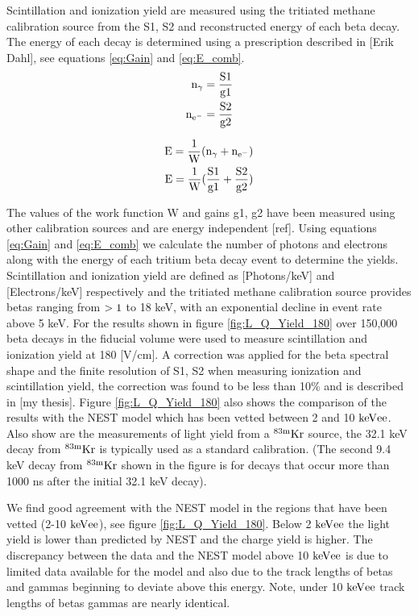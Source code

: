 Scintillation and ionization yield are measured using the tritiated methane calibration source from the S1, S2 and reconstructed energy of each beta decay. The energy of each decay is determined using a prescription described in [Erik Dahl], see equations \ref{eq:Gain} and \ref{eq:E_comb}. 
\begin{equation}
\begin{split}
\rm  n_\gamma = \frac{S1}{g1}\\
\rm n_{e^{-}} = \frac{S2}{g2}
\label{eq:Gain}
\end{split}
\end{equation}

\begin{equation}
\begin{split}
\rm E= \frac{1}{W}(n_\gamma + n_{e^-})\\
\rm E= \frac{1}{W}(\frac{S1}{g1} + \frac{S2}{g2})
\label{eq:E_comb}
\end{split}
\end{equation}

The values of the work function W and gains g1, g2 have been measured using other calibration sources and are energy independent [ref]. Using equations \ref{eq:Gain} and \ref{eq:E_comb} we calculate the number of photons and electrons along with the energy of each tritium beta decay event to determine the yields. Scintillation and ionization yield are defined as [Photons/keV] and [Electrons/keV] respectively and the tritiated methane calibration source provides betas ranging from $\rm>1$ to 18 keV, with an exponential decline in event rate above 5 keV. For the results shown in figure \ref{fig:L_Q_Yield_180} over 150,000 beta decays in the fiducial volume were used to measure scintillation and ionization yield at 180 [V/cm]. A correction was applied for the beta spectral shape and the finite resolution of S1, S2 when measuring ionization and scintillation yield, the correction was found to be less than 10\% and is described in [my thesis]. Figure \ref{fig:L_Q_Yield_180} also shows the comparison of the results with the NEST model which has been vetted between 2 and 10 $\rm keV{ee}$. Also show are the measurements of light yield from a $\rm^{83m}Kr$ source, the 32.1 keV decay from $\rm^{83m}Kr$ is typically used as a standard calibration. (The second 9.4 keV decay from $\rm^{83m}Kr$  shown in the figure is for decays that occur more than 1000 ns after the initial 32.1 keV decay).

We find good agreement with the NEST model in the regions that have been vetted (2-10 $\rm keV{ee}$), see figure \ref{fig:L_Q_Yield_180}. Below 2 $\rm keV{ee}$ the light yield is lower than predicted by NEST and the charge yield is higher. The discrepancy between the data and the NEST model above 10 $\rm keV{ee}$ is due to limited data available for the model and also due to the track lengths of betas and gammas beginning to deviate above this energy. Note, under 10 $\rm keV{ee}$ track lengths of betas gammas are nearly identical. 

